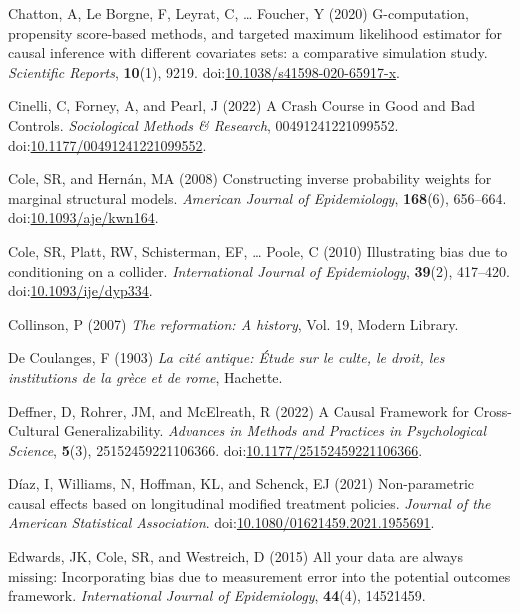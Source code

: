 \documentclass[
  singlecolumn]{article}
\newlength{\cslhangindent}
\newenvironment{CSLReferences}[2] %
 {\begin{list}{}{%
  \setlength{\itemindent}{0pt}
  \setlength{\leftmargin}{0pt}
  \setlength{\parsep}{0pt}
  \ifodd #1
   \setlength{\leftmargin}{\cslhangindent}
   \setlength{\itemindent}{-1\cslhangindent}
  \fi
  \setlength{\itemsep}{#2\baselineskip}}}
 {\end{list}}
\begin{document}
\begin{CSLReferences}{1}{0}
Chatton, A, Le Borgne, F, Leyrat, C, \ldots{} Foucher, Y (2020)
G-computation, propensity score-based methods, and targeted maximum
likelihood estimator for causal inference with different covariates
sets: a comparative simulation study. \emph{Scientific Reports},
\textbf{10}(1), 9219.
doi:\href{https://doi.org/10.1038/s41598-020-65917-x}{10.1038/s41598-020-65917-x}.

Cinelli, C, Forney, A, and Pearl, J (2022) A Crash Course in Good and
Bad Controls. \emph{Sociological Methods \& Research},
00491241221099552.
doi:\href{https://doi.org/10.1177/00491241221099552}{10.1177/00491241221099552}.

Cole, SR, and Hernán, MA (2008) Constructing inverse probability weights
for marginal structural models. \emph{American Journal of Epidemiology},
\textbf{168}(6), 656--664.
doi:\href{https://doi.org/10.1093/aje/kwn164}{10.1093/aje/kwn164}.

Cole, SR, Platt, RW, Schisterman, EF, \ldots{} Poole, C (2010)
Illustrating bias due to conditioning on a collider. \emph{International
Journal of Epidemiology}, \textbf{39}(2), 417--420.
doi:\href{https://doi.org/10.1093/ije/dyp334}{10.1093/ije/dyp334}.

Collinson, P (2007) \emph{The reformation: A history}, Vol. 19, Modern
Library.

De Coulanges, F (1903) \emph{La cité antique: Étude sur le culte, le
droit, les institutions de la grèce et de rome}, Hachette.

Deffner, D, Rohrer, JM, and McElreath, R (2022) A Causal Framework for
Cross-Cultural Generalizability. \emph{Advances in Methods and Practices
in Psychological Science}, \textbf{5}(3), 25152459221106366.
doi:\href{https://doi.org/10.1177/25152459221106366}{10.1177/25152459221106366}.

Díaz, I, Williams, N, Hoffman, KL, and Schenck, EJ (2021) Non-parametric
causal effects based on longitudinal modified treatment policies.
\emph{Journal of the American Statistical Association}.
doi:\href{https://doi.org/10.1080/01621459.2021.1955691}{10.1080/01621459.2021.1955691}.

Edwards, JK, Cole, SR, and Westreich, D (2015) All your data are always
missing: Incorporating bias due to measurement error into the potential
outcomes framework. \emph{International Journal of Epidemiology},
\textbf{44}(4), 14521459.


\end{CSLReferences}
\end{document}
